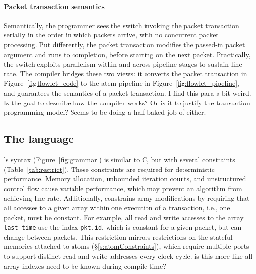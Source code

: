 \paragraph{Packet transaction semantics}
Semantically, the programmer sees the switch invoking the packet transaction
serially in the order in which packets arrive, with no concurrent packet
processing.  Put differently, the packet transaction modifies the passed-in
packet argument and runs to completion, before starting on the next packet.
Practically, the switch exploits parallelism within and across pipeline
stages to sustain line rate. The \pktlanguage compiler bridges
these two views: it converts the packet transaction in
Figure~\ref{fig:flowlet_code} to the atom pipeline in
Figure~\ref{fig:flowlet_pipeline}, and guarantees the semantics of a packet
transaction.
\ac{I find this para a bit weird. Is the goal to describe how the compiler
works? Or is it to justify the transaction programming model? Seems to be 
doing a half-baked job of either.}

\subsection{The \pktlanguage language}
\label{ss:constraints}
\pktlanguage's syntax (Figure~\ref{fig:grammar}) is similar to C, but with
several constraints (Table~\ref{tab:restrict}).  These constraints are required
for deterministic performance.  Memory allocation, unbounded iteration counts,
and unstructured control flow cause variable performance, which may prevent an
algorithm from achieving line rate.  Additionally, \pktlanguage constrains
array modifications by requiring that all accesses to a given array within one
execution of a transaction, i.e., one packet, must be constant. 
For example, all read and write accesses to the array \texttt{last\_time} use
the index \texttt{pkt.id}, which is constant for a given packet, but can change
between packets. This restriction mirrors restrictions on the stateful memories
attached to atoms (\S\ref{s:atomConstraints}), which require multiple ports to
support distinct read and write addresses every clock cycle.
\ac{is this more like all array indexes need to be known during compile time?} 

